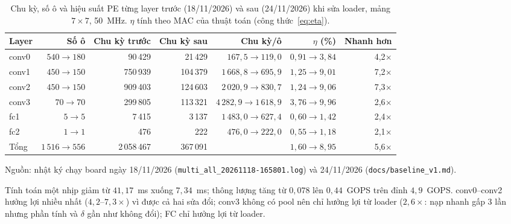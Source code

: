 \begin{table}[htbp]\centering
\caption[Chu kỳ, số ô và hiệu suất PE từng layer trước và sau khi sửa loader]{Chu kỳ, số ô và hiệu suất PE từng layer trước (18/11/2026) và sau (24/11/2026) khi sửa loader, mảng $7\times7$, 50~MHz.
$\eta$ tính theo MAC của thuật toán (công thức~\eqref{eq:eta}).}\label{tab:truocsau}
\footnotesize\setlength{\tabcolsep}{4pt}
\begin{tabular}{@{}lrrrrrr@{}}
\toprule
Layer & Số ô & Chu kỳ trước & Chu kỳ sau & Chu kỳ/ô & $\eta$ (\%) & Nhanh hơn \\ \midrule
conv0 & $540\to180$ & 90\,429  & 21\,429  & $167{,}5\to119{,}0$   & $0{,}91\to3{,}84$ & 4,2$\times$ \\
conv1 & $450\to150$ & 750\,939 & 104\,379 & $1\,668{,}8\to695{,}9$ & $1{,}25\to9{,}01$ & 7,2$\times$ \\
conv2 & $450\to150$ & 909\,403 & 124\,603 & $2\,020{,}9\to830{,}7$ & $1{,}24\to9{,}06$ & 7,3$\times$ \\
conv3 & $70\to70$   & 299\,805 & 113\,321 & $4\,282{,}9\to1\,618{,}9$ & $3{,}76\to9{,}96$ & 2,6$\times$ \\
fc1   & $5\to5$     & 7\,415   & 3\,137   & $1\,483{,}0\to627{,}4$ & $0{,}60\to1{,}42$ & 2,4$\times$ \\
fc2   & $1\to1$     & 476      & 222      & $476{,}0\to222{,}0$    & $0{,}55\to1{,}18$ & 2,1$\times$ \\ \midrule
Tổng  & $1\,516\to556$ & 2\,058\,467 & 367\,091 &  & $1{,}60\to8{,}95$ & 5,6$\times$ \\ \bottomrule
\end{tabular}

\smallskip
\footnotesize Nguồn: nhật ký chạy board ngày 18/11/2026 (\texttt{multi\_all\_20261118-165801.log}) và 24/11/2026 (\texttt{docs/baseline\_v1.md}).
\end{table}

Tính toán một nhịp giảm từ $41{,}17$~ms xuống $7{,}34$~ms; thông lượng tăng từ $0{,}078$ lên $0{,}44$~GOPS trên đỉnh $4{,}9$~GOPS.
conv0--conv2 hưởng lợi nhiều nhất ($4{,}2$--$7{,}3\times$) vì được cả hai sửa đổi; conv3 không có pool nên chỉ hưởng lợi từ loader ($2{,}6\times$: nạp nhanh gấp $3$ lần nhưng phần tính và $\delta$ gần như không đổi); FC chỉ hưởng lợi từ loader.

